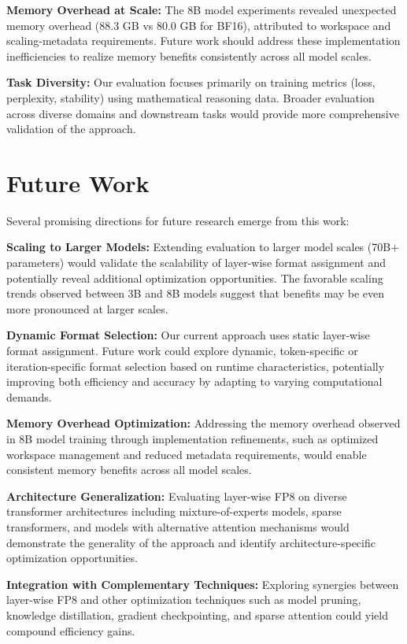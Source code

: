 \textbf{Memory Overhead at Scale:} The 8B model experiments revealed unexpected memory overhead (88.3 GB vs 80.0 GB for BF16), attributed to workspace and scaling-metadata requirements. Future work should address these implementation inefficiencies to realize memory benefits consistently across all model scales.

\textbf{Task Diversity:} Our evaluation focuses primarily on training metrics (loss, perplexity, stability) using mathematical reasoning data. Broader evaluation across diverse domains and downstream tasks would provide more comprehensive validation of the approach.
\section*{Future Work}

Several promising directions for future research emerge from this work:

\textbf{Scaling to Larger Models:} Extending evaluation to larger model scales (70B+ parameters) would validate the scalability of layer-wise format assignment and potentially reveal additional optimization opportunities. The favorable scaling trends observed between 3B and 8B models suggest that benefits may be even more pronounced at larger scales.

\textbf{Dynamic Format Selection:} Our current approach uses static layer-wise format assignment. Future work could explore dynamic, token-specific or iteration-specific format selection based on runtime characteristics, potentially improving both efficiency and accuracy by adapting to varying computational demands.

\textbf{Memory Overhead Optimization:} Addressing the memory overhead observed in 8B model training through implementation refinements, such as optimized workspace management and reduced metadata requirements, would enable consistent memory benefits across all model scales.

\textbf{Architecture Generalization:} Evaluating layer-wise FP8 on diverse transformer architectures including mixture-of-experts models, sparse transformers, and models with alternative attention mechanisms would demonstrate the generality of the approach and identify architecture-specific optimization opportunities.

\textbf{Integration with Complementary Techniques:} Exploring synergies between layer-wise FP8 and other optimization techniques such as model pruning, knowledge distillation, gradient checkpointing, and sparse attention could yield compound efficiency gains.

